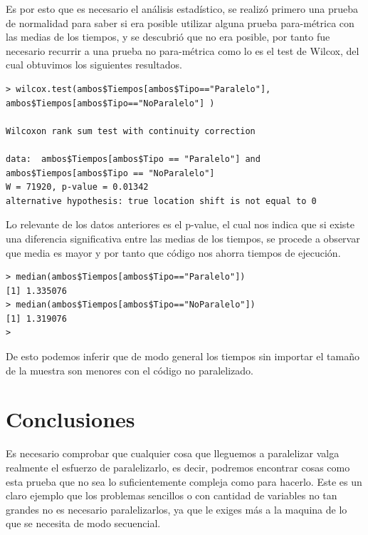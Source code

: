 \documentclass[a4paper]{article}
\begin{document}
Es por esto que es necesario el análisis estadístico, se realizó primero una prueba de normalidad para saber si era posible utilizar alguna prueba para-métrica con las medias de los tiempos, y se descubrió que no era posible, por tanto fue necesario recurrir a una prueba no para-métrica como lo es el test de Wilcox, del cual obtuvimos los siguientes resultados.

\begin{lstlisting}[frame=single]
> wilcox.test(ambos$Tiempos[ambos$Tipo=="Paralelo"],
ambos$Tiempos[ambos$Tipo=="NoParalelo"] )

Wilcoxon rank sum test with continuity correction

data:  ambos$Tiempos[ambos$Tipo == "Paralelo"] and 
ambos$Tiempos[ambos$Tipo == "NoParalelo"]
W = 71920, p-value = 0.01342
alternative hypothesis: true location shift is not equal to 0
\end{lstlisting}

Lo relevante de los datos anteriores es el p-value, el cual nos indica que si existe una diferencia significativa entre las medias de los tiempos, se procede a observar que media es mayor y por tanto que código nos ahorra tiempos de ejecución.

\begin{lstlisting}[frame=single]
> median(ambos$Tiempos[ambos$Tipo=="Paralelo"])
[1] 1.335076
> median(ambos$Tiempos[ambos$Tipo=="NoParalelo"])
[1] 1.319076
> 
\end{lstlisting}

De esto podemos inferir que de modo general los tiempos sin importar el tamaño de la muestra son menores con el código no paralelizado. 

\section{Conclusiones}
Es necesario comprobar que cualquier cosa que lleguemos a paralelizar valga realmente el esfuerzo de paralelizarlo, es decir, podremos encontrar cosas como esta prueba que no sea lo suficientemente compleja como para hacerlo. Este es un claro ejemplo que los problemas sencillos o con cantidad de variables no tan grandes no es necesario paralelizarlos, ya que le exiges más a la maquina de lo que se necesita de modo secuencial.
\end{document}
